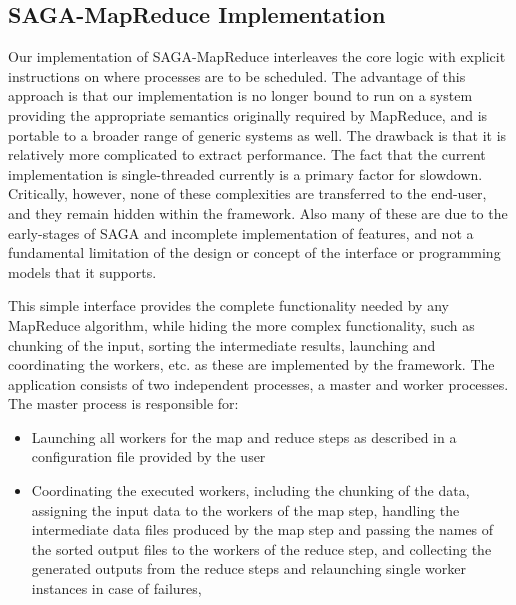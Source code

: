 \documentclass[conference,final]{IEEEtran}
\newcommand{\sagamapreduce }{SAGA-MapReduce }
\begin{document}
\subsection{\sagamapreduce Implementation}
Our implementation of \sagamapreduce interleaves the core logic with
explicit instructions on where processes are to be scheduled.  The
advantage of this approach is that our implementation is no longer
bound to run on a system providing the appropriate semantics
originally required by MapReduce, and is portable to a broader range
of generic systems as well.  The drawback is that it is relatively
more complicated to extract performance.%
The fact that the current implementation is single-threaded
currently is a primary factor for slowdown.  Critically, however, none
of these complexities are transferred to the end-user, and they remain
hidden within the framework. Also many of these are due to the
early-stages of SAGA and incomplete implementation of features, and
not a fundamental limitation of the design or concept of the interface
or programming models that it supports.

This simple interface provides the complete functionality needed by
any MapReduce algorithm, while hiding the more complex functionality,
such as chunking of the input, sorting the intermediate results,
launching and coordinating the workers, etc. as these are implemented
by the framework.  The application consists of two independent
processes, a master and worker processes. The master process is
responsible for:

\begin{itemize}
\item Launching all workers for the map and reduce steps as described
  in a configuration file provided by the user 
\item Coordinating the executed workers, including the chunking of the
  data, assigning the input data to the workers of the map step,
  handling the intermediate data files produced by the map step and
  passing the names of the sorted output files to the workers of the
  reduce step, and collecting the generated outputs from the reduce
  steps and relaunching single worker instances in case of failures,
\end{itemize}
\end{document}
